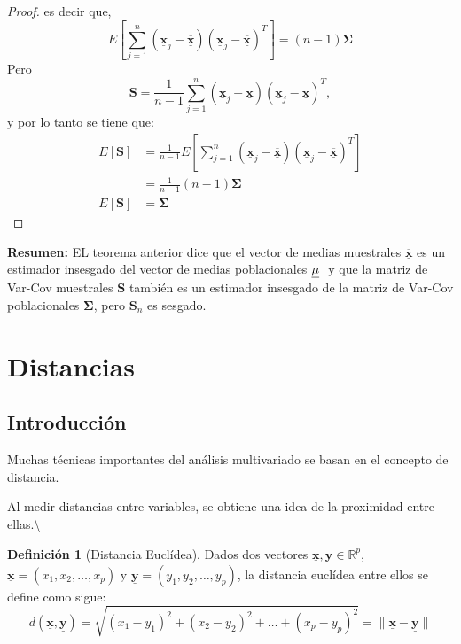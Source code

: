 \documentclass[
]{book}
\theoremstyle{definition}
\newtheorem{definition}{Definición}[chapter]
\theoremstyle{definition}
\theoremstyle{definition}
\theoremstyle{definition}
\theoremstyle{remark}
\begin{document}
\begin{proof}
es decir que,
\[
E\left[\sum_{j=1}^n(\underline{\mathbf{x}}_j - \underline{\overline{\mathbf{x}}})(\underline{\mathbf{x}}_j - \underline{\overline{\mathbf{x}}})^T \right] =(n-1)\mathbf{\Sigma}
\]
Pero
\[
\mathbf{S}=\frac{1}{n-1}\sum_{j=1}^n(\underline{\mathbf{x}}_j - \underline{\overline{\mathbf{x}}})(\underline{\mathbf{x}}_j - \underline{\overline{\mathbf{x}}})^T,
\]
y por lo tanto se tiene que:
\begin{align*}
E[\mathbf{S}]&=\frac{1}{n-1}E\left[ \sum_{j=1}^n(\underline{\mathbf{x}}_j - \underline{\overline{\mathbf{x}}})(\underline{\mathbf{x}}_j - \underline{\overline{\mathbf{x}}})^T\right]\\&
=\frac{1}{n-1}(n-1)\mathbf{\Sigma}\\
E[\mathbf{S}]&=\mathbf{\Sigma}
\end{align*}
\end{proof}

\textbf{Resumen:} EL teorema anterior dice que el vector de medias muestrales \(\underline{\overline{\mathbf{x}}}\) es un estimador insesgado del vector de medias poblacionales \(
{\large \underline{\mathbf{\mu}}}\ \) y que la matriz de Var-Cov muestrales \(\mathbf{S}\) también es un estimador insesgado de la matriz de Var-Cov poblacionales \(\mathbf{\Sigma}\), pero \(\mathbf{S}_n\) es sesgado.

\hypertarget{distancias}{%
\section{Distancias}\label{distancias}}

\hypertarget{introducciuxf3n}{%
\subsection{Introducción}\label{introducciuxf3n}}

Muchas técnicas importantes del análisis multivariado se basan en el concepto de distancia.

Al medir distancias entre variables, se obtiene una idea de la proximidad entre ellas.\textbackslash{}

\begin{definition}[Distancia Euclídea]
\protect\hypertarget{def:dist-euclid}{}\label{def:dist-euclid}Dados dos vectores \(\underline{\mathbf{x}}, \underline{\mathbf{y}} \in \mathbb{R}^p\), \(\underline{\mathbf{x}}=(x_1,x_2,\ldots,x_p)\) y
\(\underline{\mathbf{y}}=(y_1,y_2,\ldots,y_p)\), la distancia euclídea entre ellos se define como sigue:
\[
d(\underline{\mathbf{x}},\underline{\mathbf{y}})=\sqrt{(x_1-y_1)^2+(x_2-y_2)^2+\ldots+(x_p-y_p)^2}=\|\underline{\mathbf{x}}-\underline{\mathbf{y}}\|
\]
\end{definition}
\end{document}
